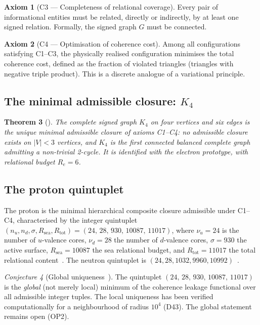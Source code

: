 \documentclass[11pt,a4paper]{article}
\theoremstyle{plain}
\newtheorem{theorem}{Theorem}[section]
\theoremstyle{definition}
\newtheorem{axiom}[theorem]{Axiom}
\theoremstyle{remark}
\newtheorem{conjecture}[theorem]{Conjecture}
\newcommand{\quintuplet}{(24,\,28,\,930,\,10087,\,11017)}
\begin{document}
\begin{axiom}[C3 --- Completeness of relational coverage]
Every pair of informational entities must be related, directly or indirectly, by at least one signed relation. Formally, the signed graph $G$ must be connected.
\end{axiom}

\begin{axiom}[C4 --- Optimisation of coherence cost]
Among all configurations satisfying C1--C3, the physically realised configuration minimises the total coherence cost, defined as the fraction of violated triangles (triangles with negative triple product). This is a discrete analogue of a variational principle.
\end{axiom}

\subsection{The minimal admissible closure: \texorpdfstring{$K_4$}{K4}}
\label{subsec:K4}
\begin{theorem}[\cite{D16a}]
\label{thm:K4}
The complete signed graph $K_4$ on four vertices and six edges is the unique minimal admissible closure of axioms C1--C4: no admissible closure exists on $|V|<3$ vertices, and $K_4$ is the first connected balanced complete graph admitting a non-trivial 2-cycle. It is identified with the electron prototype, with relational budget $R_e=6$.
\end{theorem}

\subsection{The proton quintuplet}
\label{subsec:quintuplet}
The proton is the minimal hierarchical composite closure admissible under C1--C4, characterised by the integer quintuplet $(n_u, n_d, \sigma, R_{\mathrm{sea}}, R_{\mathrm{tot}}) = \quintuplet$, where $\nu_u=24$ is the number of $u$-valence cores, $\nu_d=28$ the number of $d$-valence cores, $\sigma=930$ the active surface, $R_{\mathrm{sea}}=10087$ the sea relational budget, and $R_{\mathrm{tot}}=11017$ the total relational content~\cite{D01,D16,D16a,D16b}. The neutron quintuplet is $(24,28,1032,9960,10992)$~\cite{D22}.

\begin{conjecture}[Global uniqueness~\cite{D16,D16b}]
\label{conj:uniqueness}
The quintuplet $\quintuplet$ is the \emph{global} (not merely local) minimum of the coherence leakage functional over all admissible integer tuples. The local uniqueness has been verified computationally for a neighbourhood of radius $10^4$ (D43). The global statement remains open (OP2).
\end{conjecture}
\end{document}
